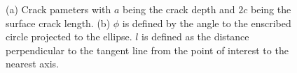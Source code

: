 \begin{figure}%
    \centering
    \qquad
    \caption{(a) Crack pameters with $a$ being the crack depth and $2c$ being the surface crack length. (b) $\phi$ is defined by the angle to the enscribed circle projected to the ellipse. $l$ is defined as the distance perpendicular to the tangent line from the point of interest to the nearest axis.}%
    \label{fig:crack_params}%
\end{figure}



